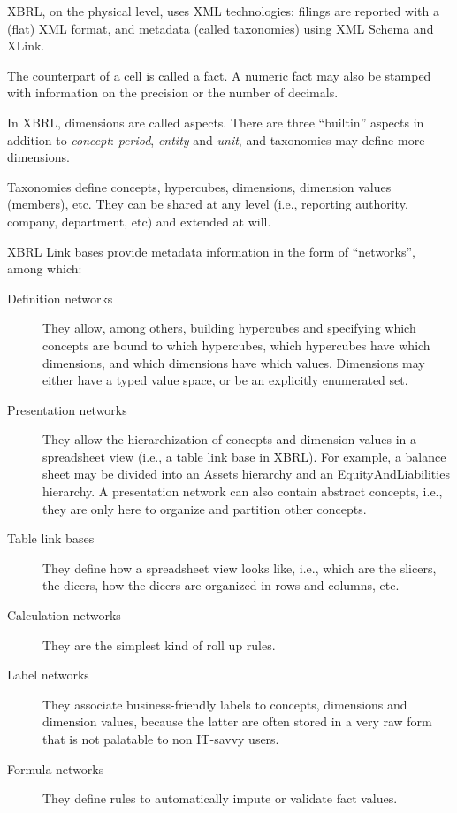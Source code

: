 \documentclass{acm_proc_article-sp}
\begin{document}
XBRL, on the physical level, uses XML technologies: filings are reported with a (flat) XML format, and metadata (called taxonomies) using XML Schema and XLink.

The counterpart of a cell is called a fact. A numeric fact may also be stamped with information on the precision or the number of decimals.

In XBRL, dimensions are called aspects. There are three ``builtin'' aspects in addition to \emph{concept}: \emph{period}, \emph{entity} and \emph{unit}, and taxonomies may define more dimensions.

Taxonomies define concepts, hypercubes, dimensions, dimension values (members), etc. They can be shared at any level (i.e., reporting authority, company, department, etc) and extended at will.

XBRL Link bases provide metadata information in the form of ``networks'', among which:

\begin{description}
\item[Definition networks] They allow, among others, building hypercubes and specifying which concepts are bound to which hypercubes, which hypercubes have which dimensions, and which dimensions have which values. Dimensions may either have a typed value space, or be an explicitly enumerated set. 
\item[Presentation networks] They allow the hierarchization of concepts and dimension values in a spreadsheet view (i.e., a table link base in XBRL). For example, a balance sheet may be divided into an Assets hierarchy and an EquityAndLiabilities hierarchy. A presentation network can also contain abstract concepts, i.e., they are only here to organize and partition other concepts. 
\item[Table link bases] They define how a spreadsheet view looks like, i.e., which are the slicers, the dicers, how the dicers are organized in rows and columns, etc.
\item[Calculation networks] They are the simplest kind of roll up rules.
\item[Label networks] They associate business-friendly labels to concepts, dimensions and dimension values, because the latter are often stored in a very raw form that is not palatable to non IT-savvy users.
\item[Formula networks] They define rules to automatically impute or validate fact values.
\end{description}
\end{document}
